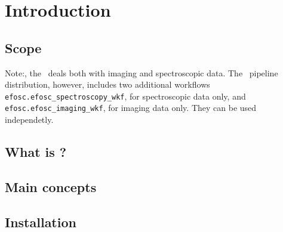\section{Introduction}

\subsection{Scope}
 Note:, the \wkfname\ deals both with
imaging and spectroscopic data. The \instname\ pipeline distribution,
however, includes two additional workflows {\tt
  efosc.efosc\_spectroscopy\_wkf}, for spectroscopic data only, and
{\tt efosc.efosc\_imaging\_wkf}, for imaging data only. They can be
used independetly.

\subsection{What is \edps?}
\label{sec:what_is_edps}


\subsection{Main concepts}
\label{sec:main_concepts}


\subsection{Installation}
\label{sec:installation}


